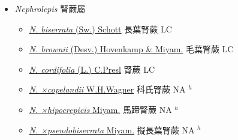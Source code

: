 
  \begin{itemize}
 \item[] \textit{Nephrolepis} 腎蕨屬
                    
  \begin{itemize}
        \item[] \href{http://www.theplantlist.org/tpl1.1/search?q=Nephrolepis+biserrata}{\textit{N. biserrata} (Sw.) Schott}   長葉腎蕨 LC
        \item[] \href{http://www.theplantlist.org/tpl1.1/search?q=Nephrolepis+brownii}{\textit{N. brownii} (Desv.) Hovenkamp \& Miyam.}     毛葉腎蕨 LC
        \item[] \href{http://www.theplantlist.org/tpl1.1/search?q=Nephrolepis+cordifolia}{\textit{N. cordifolia} (L.) C.Presl}     腎蕨 LC
        \item[] \href{http://www.theplantlist.org/tpl1.1/search?q=Nephrolepis+×copelandii}{\textit{N. ×copelandii} W.H.Wagner}   科氏腎蕨 NA $^h$
        \item[] \href{http://www.theplantlist.org/tpl1.1/search?q=Nephrolepis+×hipocrepicis}{\textit{N. ×hipocrepicis} Miyam.}   馬蹄腎蕨 NA $^h$
        \item[] \href{http://www.theplantlist.org/tpl1.1/search?q=Nephrolepis+×pseudobiserrata}{\textit{N. ×pseudobiserrata} Miyam.}   擬長葉腎蕨 NA $^h$
  \end{itemize}
  \end{itemize}
